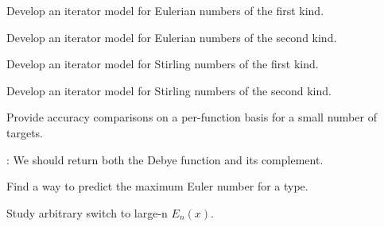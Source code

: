 
\begin{DoxyRefList}
\item[\label{todo__todo000002}%
\Hypertarget{todo__todo000002}%
Member \hyperlink{group__gnu__math__spec__func_gadfd8810a97655d2cdd1b0e3af68a79d3}{\+\_\+\+\_\+gnu\+\_\+cxx\+:\+:eulerian\+\_\+1} (unsigned int \+\_\+\+\_\+n, unsigned int \+\_\+\+\_\+m)]Develop an iterator model for Eulerian numbers of the first kind.  
\item[\label{todo__todo000003}%
\Hypertarget{todo__todo000003}%
Member \hyperlink{group__gnu__math__spec__func_ga9bc456941d5e35cf54ec9c50f2e52884}{\+\_\+\+\_\+gnu\+\_\+cxx\+:\+:eulerian\+\_\+2} (unsigned int \+\_\+\+\_\+n, unsigned int \+\_\+\+\_\+m)]Develop an iterator model for Eulerian numbers of the second kind.  
\item[\label{todo__todo000004}%
\Hypertarget{todo__todo000004}%
Member \hyperlink{group__gnu__math__spec__func_ga2b955dac7d2c5125f2091eaeb25c8ad2}{\+\_\+\+\_\+gnu\+\_\+cxx\+:\+:stirling\+\_\+1} (unsigned int \+\_\+\+\_\+n, unsigned int \+\_\+\+\_\+m)]Develop an iterator model for Stirling numbers of the first kind.  
\item[\label{todo__todo000005}%
\Hypertarget{todo__todo000005}%
Member \hyperlink{group__gnu__math__spec__func_ga3761c0e467cbe45cbda66a4e796adcd3}{\+\_\+\+\_\+gnu\+\_\+cxx\+:\+:stirling\+\_\+2} (unsigned int \+\_\+\+\_\+n, unsigned int \+\_\+\+\_\+m)]Develop an iterator model for Stirling numbers of the second kind.  
\item[\label{todo__todo000001}%
\Hypertarget{todo__todo000001}%
page \hyperlink{index}{Mathematical Special Functions} ]Provide accuracy comparisons on a per-\/function basis for a small number of targets. 
\item[\label{todo__todo000019}%
\Hypertarget{todo__todo000019}%
Member \hyperlink{namespacestd_1_1____detail_a26d3f285cfbcaba6fa30d3e4164c6187}{std\+:\+:\+\_\+\+\_\+detail\+:\+:\+\_\+\+\_\+debye} (unsigned int \+\_\+\+\_\+n, \+\_\+\+Tp \+\_\+\+\_\+x)]\+: We should return both the Debye function and it\textquotesingle{}s complement.  
\item[\label{todo__todo000008}%
\Hypertarget{todo__todo000008}%
Member \hyperlink{namespacestd_1_1____detail_a2e3eb67dee4d0b5c96824a4e8e9c227e}{std\+:\+:\+\_\+\+\_\+detail\+:\+:\+\_\+\+\_\+euler\+\_\+series} (unsigned int \+\_\+\+\_\+n)]Find a way to predict the maximum Euler number for a type.  
\item[\label{todo__todo000011}%
\Hypertarget{todo__todo000011}%
Member \hyperlink{namespacestd_1_1____detail_a0282700710ec07b8ca095fe2ec140d6e}{std\+:\+:\+\_\+\+\_\+detail\+:\+:\+\_\+\+\_\+expint} (unsigned int \+\_\+\+\_\+n, \+\_\+\+Tp \+\_\+\+\_\+x)]Study arbitrary switch to large-\/n $ E_n(x) $. 


\end{DoxyRefList}
